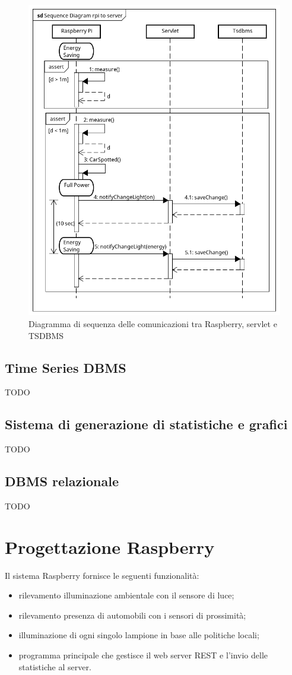 \begin{figure}[ht]
	\centering
	\includegraphics[scale=.8]{figure/Sequence_Diagram_rpi_to_server.png}
	\caption{Diagramma di sequenza delle comunicazioni tra Raspberry, servlet e TSDBMS \label{SEQ RPI TO SERVER}}
\end{figure}
\fi
\subsection{Time Series DBMS}
TODO
\subsection{Sistema di generazione di statistiche e grafici}
TODO
\subsection{DBMS relazionale}
TODO


\section{Progettazione Raspberry}
Il sistema Raspberry fornisce le seguenti funzionalità:
\begin{itemize}
 \item rilevamento illuminazione ambientale con il sensore di luce;
 \item rilevamento presenza di automobili con i sensori di prossimità;
 \item illuminazione di ogni singolo lampione in base alle politiche locali;
 \item programma principale che gestisce il web server REST e l'invio delle statistiche al server.
\end{itemize}

